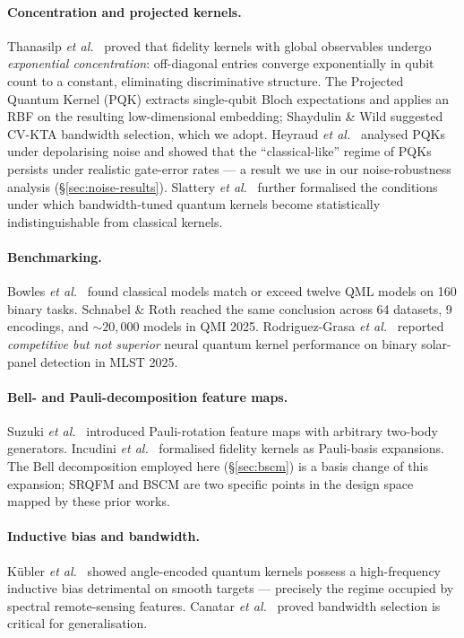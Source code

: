 \documentclass[pdflatex,sn-mathphys-num]{sn-jnl}
\theoremstyle{thmstyleone}
\theoremstyle{thmstyletwo}
\theoremstyle{thmstylethree}
\begin{document}
\paragraph{Concentration and projected kernels.}
Thanasilp \emph{et al.}\ \cite{thanasilp2024} proved that fidelity
kernels with global observables undergo \emph{exponential concentration}:
off-diagonal entries converge exponentially in qubit count to a
constant, eliminating discriminative structure. The Projected Quantum
Kernel (PQK) \cite{huang2021} extracts single-qubit Bloch expectations
and applies an RBF on the resulting low-dimensional embedding;
Shaydulin \& Wild \cite{shaydulin2022} suggested CV-KTA bandwidth
selection, which we adopt. Heyraud \emph{et al.}\ \cite{heyraud2022}
analysed PQKs under depolarising noise and showed that the
``classical-like'' regime of PQKs persists under realistic gate-error
rates --- a result we use in our noise-robustness analysis
(\S\ref{sec:noise-results}). Slattery \emph{et al.}\
\cite{slattery2025} further formalised the conditions under which
bandwidth-tuned quantum kernels become statistically indistinguishable
from classical kernels.

\paragraph{Benchmarking.}
Bowles \emph{et al.}\ \cite{bowles2024} found classical models match or
exceed twelve QML models on 160 binary tasks. Schnabel \& Roth
\cite{schnabel2025} reached the same conclusion across 64 datasets,
9 encodings, and $\sim\!20{,}000$ models in QMI 2025.
Rodriguez-Grasa \emph{et al.}\ \cite{rodriguez2025} reported
\emph{competitive but not superior} neural quantum kernel performance on
binary solar-panel detection in MLST 2025.

\paragraph{Bell- and Pauli-decomposition feature maps.}
Suzuki \emph{et al.}\ \cite{suzuki2020} introduced Pauli-rotation feature
maps with arbitrary two-body generators. Incudini \emph{et al.}\
\cite{incudini2025} formalised fidelity kernels as Pauli-basis
expansions. The Bell decomposition employed here (\S\ref{sec:bscm}) is a
basis change of this expansion; SRQFM and BSCM are two specific points
in the design space mapped by these prior works.

\paragraph{Inductive bias and bandwidth.}
K{\"u}bler \emph{et al.}\ \cite{kubler2021} showed angle-encoded quantum
kernels possess a high-frequency inductive bias detrimental on smooth
targets --- precisely the regime occupied by spectral remote-sensing
features. Canatar \emph{et al.}\ \cite{canatar2022} proved bandwidth
selection is critical for generalisation.
\end{document}
